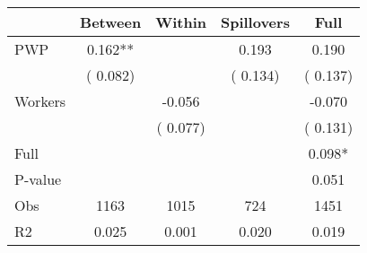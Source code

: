 
\begin{tabular}{l*{4}{c}}\hline&\multicolumn{1}{c}{Between}&\multicolumn{1}{c}{Within}&\multicolumn{1}{c}{Spillovers}&\multicolumn{1}{c}{Full}\\ \hline
 PWP           &              0.162**      &                                               &        0.193 &         0.190                            \\ 
                               &        (       0.082)           &                                       &       (       0.134)     &      (       0.137)                                           \\ 
 Workers       &                                               &       -0.056    &                                &            -0.070                            \\ 
                               &                                               & (       0.077)                  &                                        &      (       0.131)                                           \\ 
\hline                                                                                                                                                                                                                                            
 Full                  &                                               &                                               &                                        &             0.098*                                     \\ 
 P-value               &                                               &                                               &                                        &             0.051                                           \\ 
 Obs                   &               1163               &       1015                       &       724                &              1451                                               \\ 
 R2                    &                      0.025              &              0.001                      &              0.020               &                     0.019                                              \\ 
\hline \end{tabular}                                                                                                                                                                                                              